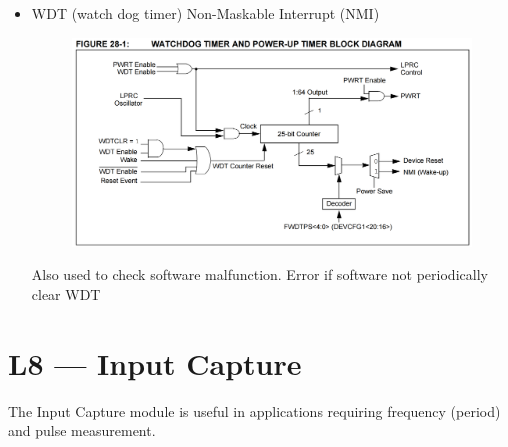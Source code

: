 \documentclass[a4paper]{article}
\begin{document}
\begin{enumerate}[label = \arabic*.]
\begin{itemize}[leftmargin = 1cm]
        \item WDT (watch dog timer) Non-Maskable Interrupt (NMI)
          \begin{figure}[H]
            \centering
            \includegraphics[width=0.8\linewidth]{Watch_dog_timer_block_diagram.png}
            \label{fig:Watch_dog_timer_block_diagram.png}
          \end{figure}

          \par Also used to check software malfunction. Error if software not periodically clear WDT
      \end{itemize}

  \end{enumerate}


\section*{L8 --- Input Capture}
  \par The Input Capture module is useful in applications requiring frequency (period) and pulse measurement.
\end{document}
